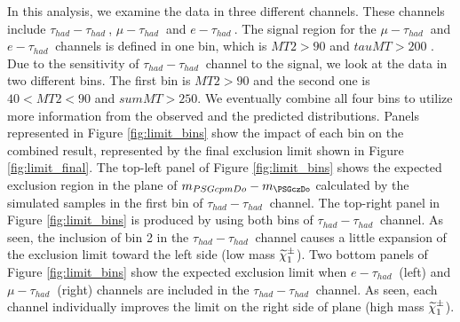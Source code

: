 In this analysis, we examine the data in three different channels.
These channels include $\tau_{had}-\tau_{had}~$, $\mu-\tau_{had}~$ and $e-\tau_{had}~$.
The signal region for the $\mu-\tau_{had}~$ and $e-\tau_{had}~$ channels is defined in one bin, which is $MT2 > 90$ and $tauMT > 200$ .
Due to the sensitivity of $\tau_{had}-\tau_{had}~$ channel to the signal, we look at the data in two different bins.
The first bin is $MT2 > 90$ and the second one is $40 < MT2 < 90$ and $sumMT>250$.
We eventually combine all four bins to utilize more information from the observed and the predicted distributions.
Panels represented in Figure \ref{fig:limit_bins} show the impact of each bin on the combined result, represented by the final exclusion limit shown in Figure \ref{fig:limit_final}. The top-left panel of Figure \ref{fig:limit_bins} shows the expected exclusion region in the plane of $m_{PSGcpmDo}-m_{\PSGczDo}$
calculated by the simulated samples in the first bin of $\tau_{had}-\tau_{had}~$ channel. The top-right panel in Figure \ref{fig:limit_bins} is produced by using both bins of $\tau_{had}-\tau_{had}~$ channel.
As seen, the inclusion of bin 2 in the $\tau_{had}-\tau_{had}~$ channel causes a little expansion of the exclusion limit toward the left side (low mass 
$\widetilde{\chi}_{1}^{\pm}$).
Two bottom panels of Figure \ref{fig:limit_bins} show the expected exclusion limit when $e-\tau_{had}~$ (left) and $\mu-\tau_{had}~$ (right) channels are included in the $\tau_{had}-\tau_{had}~$ channel.  As seen, each channel individually improves the limit on the right side of plane (high mass $\widetilde{\chi}_{1}^{\pm}$).


